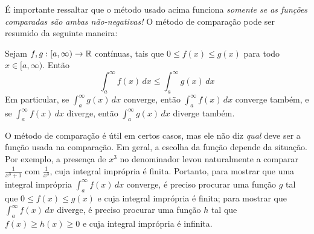 É importante ressaltar que o método usado acima funciona \emph{somente se as funções comparadas são
ambas não-negativas!}
O método de comparação pode ser resumido da seguinte maneira:

\begin{pro}
Sejam $f,g:[a,\infty)\to \mathbb{R}$ contínuas, tais que $0\leq f(x)\leq g(x)$ para
todo $x\in
[a,\infty)$. Então 
$$\int_a^\infty f(x)\,dx\leq \int_a^\infty g(x)\,dx$$
Em particular, se $\int_a^\infty g(x)\,dx$ converge, então 
$\int_a^\infty f(x)\,dx$ converge também, e se $\int_a^\infty f(x)\,dx$
diverge, então $\int_a^\infty g(x)\,dx$ diverge também.
\end{pro}

\begin{obs}
O método de comparação é útil em certos casos, mas ele não diz 
\emph{qual} deve ser a função usada na comparação.
Em geral, a escolha da função depende da situação. Por exemplo, a presença
de $x^3$ no denominador levou naturalmente a comparar
$\frac{1}{x^3+1}$ com $\frac{1}{x^3}$, cuja integral imprópria é finita.
Portanto, para mostrar que uma integral imprópria $\int_a^\infty f(x)\,dx$
converge, é preciso procurar uma função $g$ tal que $0\leq f(x)\leq g(x)$ e cuja
integral imprópria é finita;
para mostrar que $\int_a^\infty f(x)\,dx$
diverge, é preciso procurar uma função $h$ tal que $f(x)\geq h(x)\geq 0$ e cuja
integral imprópria é infinita.
\end{obs}

